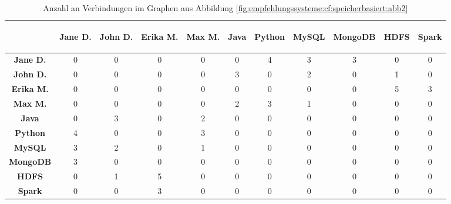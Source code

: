\begin{table}[h]
	\centering
	\begin{tabular}{c|c|c|c|c|c|c|c|c|c|c}
		& \begin{sideways}\textbf{Jane D.}\end{sideways} & \begin{sideways}\textbf{John D.}\end{sideways} & \begin{sideways}\textbf{Erika M.}\end{sideways} & \begin{sideways}\textbf{Max M.}\end{sideways} & \begin{sideways}\textbf{Java}\end{sideways} & \begin{sideways}\textbf{Python}\end{sideways} & \begin{sideways}\textbf{MySQL}\end{sideways} & \begin{sideways}\textbf{MongoDB}\end{sideways} & \begin{sideways}\textbf{HDFS}\end{sideways} & \begin{sideways}\textbf{Spark}\end{sideways} \\
		\hline
		\textbf{Jane D.}  & 0 & 0 & 0 & 0 & 0 & 4 & 3 & 3 & 0 & 0\\
		\textbf{John D.}  & 0 & 0 & 0 & 0 & 3 & 0 & 2 & 0 & 1 & 0\\
		\textbf{Erika M.} & 0 & 0 & 0 & 0 & 0 & 0 & 0 & 0 & 5 & 3\\
		\textbf{Max M.}   & 0 & 0 & 0 & 0 & 2 & 3 & 1 & 0 & 0 & 0\\
		\textbf{Java}     & 0 & 3 & 0 & 2 & 0 & 0 & 0 & 0 & 0 & 0\\
		\textbf{Python}   & 4 & 0 & 0 & 3 & 0 & 0 & 0 & 0 & 0 & 0\\
		\textbf{MySQL}    & 3 & 2 & 0 & 1 & 0 & 0 & 0 & 0 & 0 & 0\\
		\textbf{MongoDB}  & 3 & 0 & 0 & 0 & 0 & 0 & 0 & 0 & 0 & 0\\
		\textbf{HDFS}     & 0 & 1 & 5 & 0 & 0 & 0 & 0 & 0 & 0 & 0\\
		\textbf{Spark}    & 0 & 0 & 3 & 0 & 0 & 0 & 0 & 0 & 0 & 0
	\end{tabular}
	\caption{Anzahl an Verbindungen im Graphen aus Abbildung \ref{fig:empfehlungssysteme:cf:speicherbasiert:abb2}}
	\label{tbl:empfehlungssysteme:arbeitsweise:tbl2}
\end{table}

